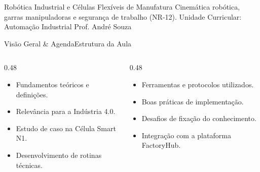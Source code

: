 
\senaicover
  {Robótica Industrial e Células Flexíveis de Manufatura}
  {Cinemática robótica, garras manipuladoras e segurança de trabalho (NR-12).}
  {Unidade Curricular: Automação Industrial}
  {Prof. André Souza}

\begin{senaiframe}{Visão Geral \& Agenda}{Estrutura da Aula}
  \begin{columns}[t]
    \begin{column}{0.48\textwidth}
      \begin{tcolorbox}[senaibluecard, title={1. Conceitos Chave}]
        \begin{itemize}
          \item Fundamentos teóricos e definições.
          \item Relevância para a Indústria 4.0.
        \end{itemize}
      \end{tcolorbox}
      \vspace{4pt}
      \begin{tcolorbox}[senaiambercard, title={3. Aplicação Prática}]
        \begin{itemize}
          \item Estudo de caso na Célula Smart N1.
          \item Desenvolvimento de rotinas técnicas.
        \end{itemize}
      \end{tcolorbox}
    \end{column}
    \begin{column}{0.48\textwidth}
      \begin{tcolorbox}[senairedcard, title={2. Detalhamento Técnico}]
        \begin{itemize}
          \item Ferramentas e protocolos utilizados.
          \item Boas práticas de implementação.
        \end{itemize}
      \end{tcolorbox}
      \vspace{4pt}
      \begin{tcolorbox}[senaigreencard, title={4. Exercícios \& Avaliação}]
        \begin{itemize}
          \item Desafios de fixação do conhecimento.
          \item Integração com a plataforma FactoryHub.
        \end{itemize}
      \end{tcolorbox}
    \end{column}
  \end{columns}
\end{senaiframe}

